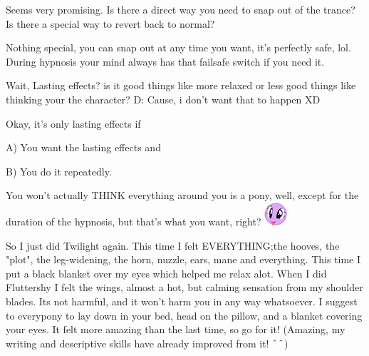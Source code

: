 \documentclass[ebook,12pt,oneside,openany]{memoir}
\newcommand{\carat}{$\char`\^$}
\begin{document}
\begin{tcolorbox}[title=Devvy \ding{170}Flutties\ding{170},colback=teal!5!white,colframe=teal!75!black,coltitle=white]
\begin{tcolorbox}[title=Opalicious]
\par{Seems very promising. Is there a direct way you need to snap out of the trance? Is there a special way to revert back to normal?}
\end{tcolorbox}
\par{Nothing special, you can snap out at any time you want, it's perfectly safe, lol. During hypnosis your mind always has that failsafe switch if you need it.}
\newline{}
\begin{tcolorbox}[title=themildlyconfusedgamer]
\par{Wait, Lasting effects? is it good things like more relaxed or less good things like thinking your the character? D: Cause, i don't want that to happen XD }
\end{tcolorbox}
\par{Okay, it's only lasting effects if}
\newline{}
\par{A) You want the lasting effects and}
\par{B) You do it repeatedly.}
\newline{}
\par{You won't actually THINK everything around you is a pony, well, except for the duration of the hypnosis, but that's what you want, right? \includegraphics{images/mlp_eW9KEfP.png}}
\end{tcolorbox}
\begin{tcolorbox}[title=Sketchi Inktip Quillwing]
\par{So I just did Twilight again. This time I felt EVERYTHING;the hooves, the "plot", the leg-widening, the horn, nuzzle, ears, mane and everything. This time I put a black blanket over my eyes which helped me relax alot. When I did Fluttershy I felt the wings, almost a hot, but calming sensation from my shoulder blades. Its not harmful, and it won't harm you in any way whatsoever. I suggest to everypony to lay down in your bed, head on the pillow, and a blanket covering your eyes. It felt more amazing than the last time, so go for it! (Amazing, my writing and descriptive skills have already improved from it! \carat{}\carat{})}
\end{tcolorbox}
\end{document}
